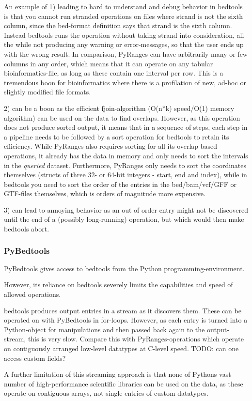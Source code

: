 \documentclass[10pt,letterpaper]{article}
\begin{document}
An example of 1) leading to hard to understand and debug behavior in bedtools is
that you cannot run stranded operations on files where strand is not the sixth
column, since the bed-format definition says that strand is the sixth column.
Instead bedtools runs the operation without taking strand into consideration,
all the while not producing any warning or error-messages, so that the user ends
up with the wrong result. In comparison, PyRanges can have arbitrarily many or
few columns in any order, which means that it can operate on any tabular
bioinformatics-file, as long as these contain one interval per row. This is a
tremendous boon for bioinformatics where there is a profilation of new, ad-hoc
or slightly modified file formats.

2) can be a boon as the efficient fjoin-algorithm (O(n*k) speed/O(1) memory
algorithm) can be used on the data to find overlaps. However, as this operation
does not produce sorted output, it means that in a sequence of steps, each step
in a pipeline needs to be followed by a sort operation for bedtools to retain
its efficiency. While PyRanges also requires sorting for all its overlap-based
operations, it already has the data in memory and only needs to sort the
intervals in the \textit{queried} dataset. Furthermore, PyRanges only needs to
sort the coordinates themselves (structs of three 32- or 64-bit integers -
start, end and index), while in bedtools you need to sort the order of the
entries in the bed/bam/vcf/GFF or GTF-files themselves, which is orders of
magnitude more expensive.

3) can lead to annoying behavior as an out of order entry might not be
discovered until the end of a (possibly long-running) operation, but which would
then make bedtools abort.

\subsubsection*{PyBedtools}

PyBedtools gives access to bedtools from the Python programming-environment.

However, its reliance on bedtools severely limits the capabilities and speed of
allowed operations.

bedtools produces output entries in a stream as it discovers them. These can be
operated on with PyBedtools in for-loops. However, as each entry is turned into
a Python-object for manipulations and then passed back again to the
output-stream, this is very slow. Compare this with PyRanges-operations which
operate on contiguously arranged low-level datatypes at C-level speed.
TODO: can one access custom fields?

A further limitation of this streaming approach is that none of Pythons vast
number of high-performance scientific libraries can be used on the data, as
these operate on contiguous arrays, not single entries of custom datatypes.







\end{document}
